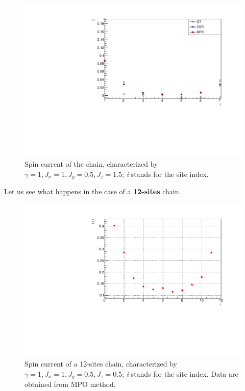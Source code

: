 \begin{figure}[H]
    \centering
    \includegraphics[scale=0.7]{Figures/8sites_comparison/SpinCurr_8s_J10515.pdf}
    \caption{Spin current of the chain, characterized by $\gamma=1, J_x=1, J_y=0.5, J_z=1.5$; \emph{i} stands for the site index.}
    \label{fig:my_label}
\end{figure}

Let us see what happens in the case of a \textbf{12-sites} chain.

\begin{figure}[H]
    \centering
    \includegraphics[scale=0.7]{Figures/12sites/SpinCurrL012m060Time002000_J10505.pdf}
    \caption{Spin current of a 12-sites chain, characterized by $\gamma=1, J_x=1, J_y=0.5, J_z=0.5$; \emph{i} stands for the site index. Data are obtained from MPO method.}
    \label{fig:my_label}
\end{figure}

